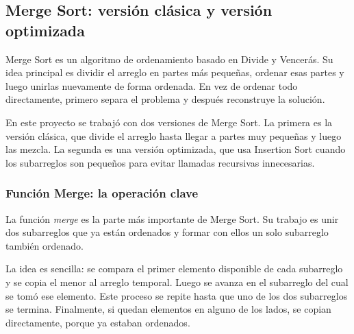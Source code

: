 \subsection{Merge Sort: versión clásica y versión optimizada}\label{sec:mergesort}

Merge Sort es un algoritmo de ordenamiento basado en Divide y Vencerás. Su idea principal es dividir el arreglo en partes más pequeñas, ordenar esas partes y luego unirlas nuevamente de forma ordenada. En vez de ordenar todo directamente, primero separa el problema y después reconstruye la solución.

En este proyecto se trabajó con dos versiones de Merge Sort. La primera es la versión clásica, que divide el arreglo hasta llegar a partes muy pequeñas y luego las mezcla. La segunda es una versión optimizada, que usa Insertion Sort cuando los subarreglos son pequeños para evitar llamadas recursivas innecesarias.

\subsubsection{Función Merge: la operación clave}

La función \textit{merge} es la parte más importante de Merge Sort. Su trabajo es unir dos subarreglos que ya están ordenados y formar con ellos un solo subarreglo también ordenado.

La idea es sencilla: se compara el primer elemento disponible de cada subarreglo y se copia el menor al arreglo temporal. Luego se avanza en el subarreglo del cual se tomó ese elemento. Este proceso se repite hasta que uno de los dos subarreglos se termina. Finalmente, si quedan elementos en alguno de los lados, se copian directamente, porque ya estaban ordenados.


